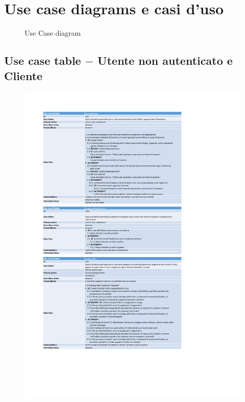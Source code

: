 
\newpage
\section{Use case diagrams e casi d'uso}

\begin{figure}[h!]
    \centerline{}
    \caption{Use Case diagram}
    \label{fig:useCase}
\end{figure}

\newpage
\subsection{Use case table $-$ Utente non autenticato e Cliente}

\begin{figure}[h!]
    \centering
    \includegraphics[trim= 1.8cm 4.3cm 5cm 1.9cm, clip]{Deliverables/first-deliverable/img/UseCase/UseCase-Table-Client.pdf}
\end{figure}

